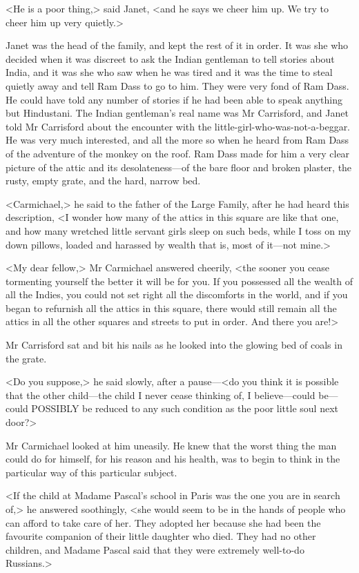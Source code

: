 <He is a poor thing,> said Janet, <and he says we cheer him up. We try to cheer him up very quietly.>

Janet was the head of the family, and kept the rest of it in order. It was she who decided when it was discreet to ask the Indian gentleman to tell stories about India, and it was she who saw when he was tired and it was the time to steal quietly away and tell Ram Dass to go to him. They were very fond of Ram Dass. He could have told any number of stories if he had been able to speak anything but Hindustani. The Indian gentleman's real name was Mr Carrisford, and Janet told Mr Carrisford about the encounter with the little-girl-who-was-not-a-beggar. He was very much interested, and all the more so when he heard from Ram Dass of the adventure of the monkey on the roof. Ram Dass made for him a very clear picture of the attic and its desolateness—of the bare floor and broken plaster, the rusty, empty grate, and the hard, narrow bed.

<Carmichael,> he said to the father of the Large Family, after he had heard this description, <I wonder how many of the attics in this square are like that one, and how many wretched little servant girls sleep on such beds, while I toss on my down pillows, loaded and harassed by wealth that is, most of it—not mine.>

<My dear fellow,> Mr Carmichael answered cheerily, <the sooner you cease tormenting yourself the better it will be for you. If you possessed all the wealth of all the Indies, you could not set right all the discomforts in the world, and if you began to refurnish all the attics in this square, there would still remain all the attics in all the other squares and streets to put in order. And there you are!>

Mr Carrisford sat and bit his nails as he looked into the glowing bed of coals in the grate.

<Do you suppose,> he said slowly, after a pause—<do you think it is possible that the other child—the child I never cease thinking of, I believe—could be—could POSSIBLY be reduced to any such condition as the poor little soul next door?>

Mr Carmichael looked at him uneasily. He knew that the worst thing the man could do for himself, for his reason and his health, was to begin to think in the particular way of this particular subject.

<If the child at Madame Pascal's school in Paris was the one you are in search of,> he answered soothingly, <she would seem to be in the hands of people who can afford to take care of her. They adopted her because she had been the favourite companion of their little daughter who died. They had no other children, and Madame Pascal said that they were extremely well-to-do Russians.>

